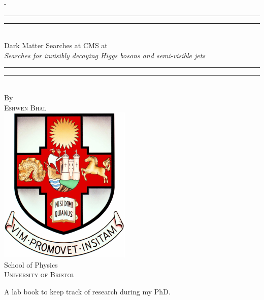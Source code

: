 \documentclass[a4paper,12pt,leqno,openbib,oldfontcommands,oneside]{memoir} %
\begin{document}
\frontmatter
{}

\begin{titlingpage}
  \begin{SingleSpace}
  \calccentering{\unitlength} 
  \begin{adjustwidth*}{\unitlength}{-\unitlength}
  \vspace*{13mm}
  \begin{center}
  \rule[0.5ex]{\linewidth}{2pt}\vspace*{-\baselineskip}\vspace*{3.2pt}
  \rule[0.5ex]{\linewidth}{1pt}\\[\baselineskip]
  {\HUGE Dark Matter Searches at CMS at \comruntwo}\\[4mm] %
  {\Large \textit{Searches for invisibly decaying Higgs bosons and semi-visible jets}}\\ %
  \rule[0.5ex]{\linewidth}{1pt}\vspace*{-\baselineskip}\vspace{3.2pt}
  \rule[0.5ex]{\linewidth}{2pt}\\
  \vspace{6.5mm}
  {\large By}\\
  \vspace{6.5mm}
  {\large\textsc{Eshwen Bhal}}\\  %
  \vspace{11mm}
  \includegraphics[scale=0.6]{headers/bristolcrest_colour}\\  %
  \vspace{6mm}
  {\large School of Physics\\  %
  \textsc{University of Bristol}}\\  %
  \vspace{11mm}
  \begin{minipage}{10cm}
  A lab book to keep track of research during my PhD.
  

\end{minipage}
\end{center}
\end{adjustwidth*}
\end{SingleSpace}
\end{titlingpage}
\end{document}

